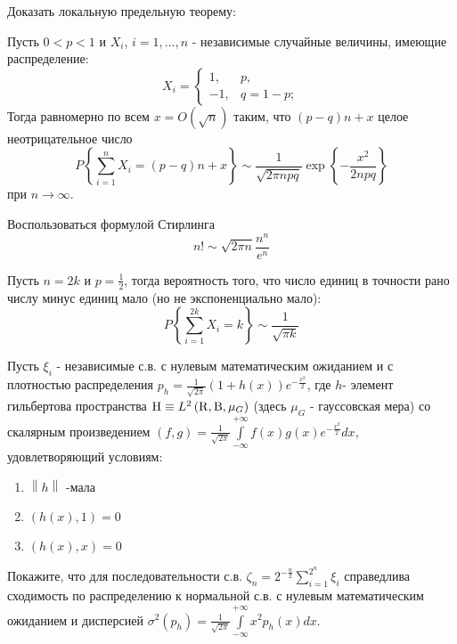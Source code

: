 \begin{problem}

Доказать локальную предельную теорему:

\noindent Пусть $0<p<1$ и $X_{i} $, $i=1,...,n$ - независимые случайные величины, имеющие распределение:
\[X_{i} =\left\{\begin{array}{cc} {1,} & {p,} \\ {-1,} & {q=1-p;} \end{array}\right. \] 
Тогда равномерно по всем $x=O\left(\sqrt{n} \right)$ таким, что $(p-q)n+x$ целое неотрицательное число
\[P\left\{\sum _{i=1}^{n}X_{i} =(p-q)n+x \right\}\sim \frac{1}{\sqrt{2\pi npq} } \exp \left\{-\frac{x^{2} }{2npq} \right\}\] 
при $n\to \infty $. 

\begin{ordre}
Воспользоваться формулой Стирлинга
\[
n! \sim \sqrt{2 \pi n} \frac{n^n}{e^n} 
\]
\end{ordre}

\begin{remark}
Пусть $n=2k$ и $p=\frac{1}{2} $, тогда вероятность того, что число единиц в точности рано числу минус единиц мало (но не экспоненциально мало):
\[P\left\{\sum _{i=1}^{2k}X_{i} =k \right\}\sim \frac{1}{\sqrt{\pi k} } \] 
\end{remark}

\end{problem}

\begin{problem}

Пусть $\xi _i $ - независимые с.в. с нулевым математическим ожиданием и с 
плотностью распределения $p_h =\frac{1}{\sqrt {2\pi } }\left( {1+h(x)} 
\right)e^{-\frac{x^2}{2}}$, где $h$- элемент гильбертова пространства ${\rm 
H}\equiv L^2\left( {{\rm R},{\rm B},\mu _G } \right)$ (здесь $\mu _G $ - 
гауссовская мера) со скалярным произведением $\left( {f,g} 
\right)=\frac{1}{\sqrt {2\pi } }\int\limits_{-\infty }^{+\infty } 
{f(x)g(x)e^{-\frac{x^2}{2}}dx} $, удовлетворяющий условиям:

\begin{enumerate}
\item $\left\| h \right\|$ -мала

\item $\left( {h(x),1} \right)=0$

\item $\left( {h(x),x} \right)=0$

\end{enumerate}

Покажите, что для последовательности с.в. $\zeta _n 
=2^{-\frac{n}{2}}\sum\limits_{i=1}^{2^n} {\xi _i } $ справедлива сходимость 
по распределению к нормальной с.в. с нулевым математическим ожиданием и 
дисперсией $\sigma ^2(p_h )=\frac{1}{\sqrt {2\pi } }\int\limits_{-\infty 
}^{+\infty } {x^2p_h (x)dx} $.

\end{problem}

